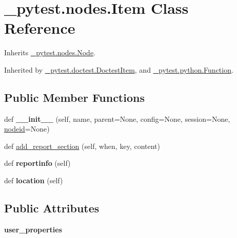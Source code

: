 \hypertarget{class__pytest_1_1nodes_1_1_item}{}\section{\+\_\+pytest.\+nodes.\+Item Class Reference}
\label{class__pytest_1_1nodes_1_1_item}


Inherits \hyperlink{class__pytest_1_1nodes_1_1_node}{\+\_\+pytest.\+nodes.\+Node}.



Inherited by \hyperlink{class__pytest_1_1doctest_1_1_doctest_item}{\+\_\+pytest.\+doctest.\+Doctest\+Item}, and \hyperlink{class__pytest_1_1python_1_1_function}{\+\_\+pytest.\+python.\+Function}.

\subsection*{Public Member Functions}
\begin{DoxyCompactItemize}
\item 
\mbox{\label{class__pytest_1_1nodes_1_1_item_a79dea2788fe1654da6a3efdcd0d69122}} 
def {\bfseries \+\_\+\+\_\+init\+\_\+\+\_\+} (self, name, parent=None, config=None, session=None, \hyperlink{class__pytest_1_1nodes_1_1_node_a02f18acbfaf1f9d8ba9b6c1346dc6217}{nodeid}=None)
\item 
def \hyperlink{class__pytest_1_1nodes_1_1_item_a0e615159d77a322c8ac4c69bd1b443dc}{add\+\_\+report\+\_\+section} (self, when, key, content)
\item 
\mbox{\label{class__pytest_1_1nodes_1_1_item_ab85ef001dd492e34d3103f0d958af076}} 
def {\bfseries reportinfo} (self)
\item 
\mbox{\label{class__pytest_1_1nodes_1_1_item_aba36ee71a12b12ef76b4be81422c641c}} 
def {\bfseries location} (self)
\end{DoxyCompactItemize}
\subsection*{Public Attributes}
\begin{DoxyCompactItemize}
\item 
\mbox{\label{class__pytest_1_1nodes_1_1_item_ab3e092148955d28d88a4350ed24fce4f}} 
{\bfseries user\+\_\+properties}
\end{DoxyCompactItemize}
